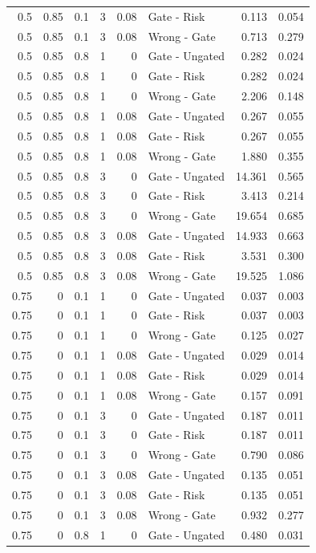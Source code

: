 \begin{longtable}{rrrrrlrr}
0.5 & 0.85 & 0.1 & 3 & 0.08 & Gate - Risk & 0.113 & 0.054\\
0.5 & 0.85 & 0.1 & 3 & 0.08 & Wrong - Gate & 0.713 & 0.279\\
0.5 & 0.85 & 0.8 & 1 & 0 & Gate - Ungated & 0.282 & 0.024\\
0.5 & 0.85 & 0.8 & 1 & 0 & Gate - Risk & 0.282 & 0.024\\
0.5 & 0.85 & 0.8 & 1 & 0 & Wrong - Gate & 2.206 & 0.148\\
0.5 & 0.85 & 0.8 & 1 & 0.08 & Gate - Ungated & 0.267 & 0.055\\
0.5 & 0.85 & 0.8 & 1 & 0.08 & Gate - Risk & 0.267 & 0.055\\
0.5 & 0.85 & 0.8 & 1 & 0.08 & Wrong - Gate & 1.880 & 0.355\\
0.5 & 0.85 & 0.8 & 3 & 0 & Gate - Ungated & 14.361 & 0.565\\
0.5 & 0.85 & 0.8 & 3 & 0 & Gate - Risk & 3.413 & 0.214\\
0.5 & 0.85 & 0.8 & 3 & 0 & Wrong - Gate & 19.654 & 0.685\\
0.5 & 0.85 & 0.8 & 3 & 0.08 & Gate - Ungated & 14.933 & 0.663\\
0.5 & 0.85 & 0.8 & 3 & 0.08 & Gate - Risk & 3.531 & 0.300\\
0.5 & 0.85 & 0.8 & 3 & 0.08 & Wrong - Gate & 19.525 & 1.086\\
0.75 & 0 & 0.1 & 1 & 0 & Gate - Ungated & 0.037 & 0.003\\
0.75 & 0 & 0.1 & 1 & 0 & Gate - Risk & 0.037 & 0.003\\
0.75 & 0 & 0.1 & 1 & 0 & Wrong - Gate & 0.125 & 0.027\\
0.75 & 0 & 0.1 & 1 & 0.08 & Gate - Ungated & 0.029 & 0.014\\
0.75 & 0 & 0.1 & 1 & 0.08 & Gate - Risk & 0.029 & 0.014\\
0.75 & 0 & 0.1 & 1 & 0.08 & Wrong - Gate & 0.157 & 0.091\\
0.75 & 0 & 0.1 & 3 & 0 & Gate - Ungated & 0.187 & 0.011\\
0.75 & 0 & 0.1 & 3 & 0 & Gate - Risk & 0.187 & 0.011\\
0.75 & 0 & 0.1 & 3 & 0 & Wrong - Gate & 0.790 & 0.086\\
0.75 & 0 & 0.1 & 3 & 0.08 & Gate - Ungated & 0.135 & 0.051\\
0.75 & 0 & 0.1 & 3 & 0.08 & Gate - Risk & 0.135 & 0.051\\
0.75 & 0 & 0.1 & 3 & 0.08 & Wrong - Gate & 0.932 & 0.277\\
0.75 & 0 & 0.8 & 1 & 0 & Gate - Ungated & 0.480 & 0.031\\

\end{longtable}
